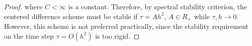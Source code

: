 \documentclass[a4paper]{amsproc}
\theoremstyle{plain}
\theoremstyle{definition}
\theoremstyle{remark}
\numberwithin{equation}{section}
\begin{document}
\begin{proof}
where $C < \infty$ is a constant. Therefore, by spectral stability criterion, the centered difference scheme must be stable if $\tau = Ah^2$, $A \in R_+$ while $\tau, h \rightarrow 0$. However, this scheme is not preferred practically, since the stability requirement on the time step $\tau = O(h^2)$ is too rigid.
                                                                                                                  
\end{proof}

% 
% 
% 
% 
\end{document}
